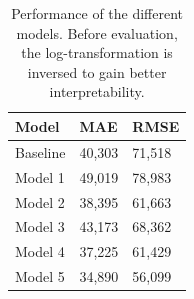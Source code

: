 \documentclass[letterpaper]{article} %
\begin{document}
\begin{table}[b]
\centering
\begin{tabular}{|l|l|l|}
\hline
\textbf{Model} & \textbf{MAE} & \textbf{RMSE}  \\ \hline
Baseline & 40,303  & 71,518 \\
Model 1 & 49,019  &  78,983  \\
Model 2 & 38,395 & 61,663  \\
Model 3 &  43,173  & 68,362 \\
Model 4 & 37,225 & 61,429 \\
Model 5 & 34,890 & 56,099 \\
\hline
\end{tabular}
\caption{Performance of the different models. Before evaluation, the log-transformation is inversed to gain better interpretability.}
\label{tab:results_performance}
\end{table}
\end{document}
